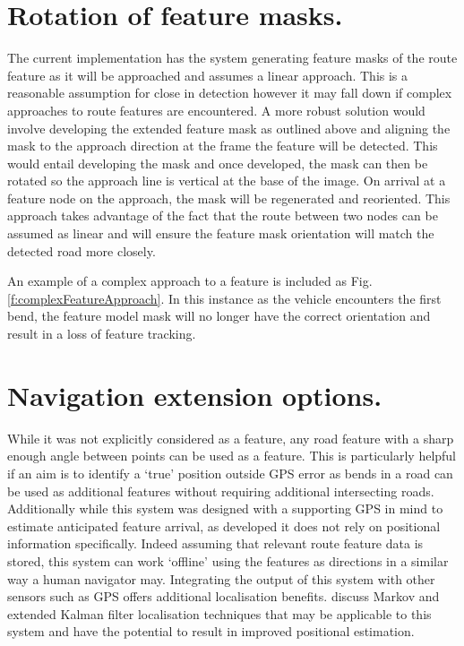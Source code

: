 \documentclass{article}
\begin{document}
\section{Rotation of feature masks.} The current implementation has the system generating feature masks of the route feature as it will be approached and assumes a linear approach. This is a reasonable assumption for close in detection however it may fall down if complex approaches to route features are encountered. A more robust solution would involve developing the extended feature mask as outlined above and aligning the mask to the approach direction at the frame the feature will be detected. This would entail developing the mask and once developed, the mask can then be rotated so the approach line is vertical at the base of the image. On arrival at a feature node on the approach, the mask will be regenerated and reoriented. This approach takes advantage of the fact that the route between two nodes can be assumed as linear and will ensure the feature mask orientation will match the detected road more closely. 

An example of a complex approach to a feature is included as Fig. \ref{f:complexFeatureApproach}. In this instance as the vehicle encounters the first bend, the feature model mask will no longer have the correct orientation and result in a loss of feature tracking. 


\section{Navigation extension options.} While it was not explicitly considered as a feature, any road feature with a sharp enough angle between points can be used as a feature. This is particularly helpful if an aim is to identify a `true' position outside GPS error as bends in a road can be used as additional features without requiring additional intersecting roads. Additionally while this system was designed with a supporting GPS in mind to estimate anticipated feature arrival, as developed it does not rely on positional information specifically. Indeed assuming that relevant route feature data is stored, this system can work `offline' using the features as directions in a similar way a human navigator may. Integrating the output of this system with other sensors such as GPS offers additional localisation benefits. \citet{probabalisticRobotics} discuss Markov and extended Kalman filter localisation techniques that may be applicable to this system and have the potential to result in improved positional estimation.
\end{document}
